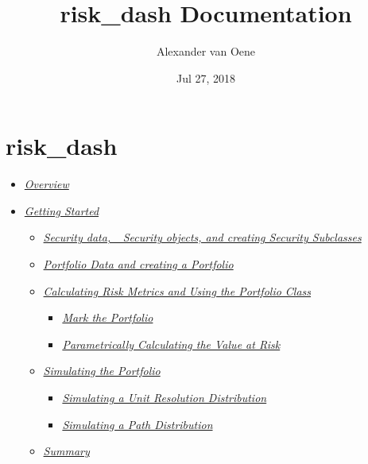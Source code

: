 \documentclass[letterpaper,10pt,english]{sphinxmanual}
\title{risk\_dash Documentation}
\date{Jul 27, 2018}
\author{Alexander van Oene}
\begin{document}
\maketitle
\sphinxtableofcontents
{}\label{\detokenize{index::doc}}

\label{\detokenize{gettingstarted:gettingstarted}}

\chapter{risk\_dash}
\label{\detokenize{gettingstarted:risk-dash}}\label{\detokenize{gettingstarted::doc}}\begin{itemize}
\item {} 
{\hyperref[\detokenize{gettingstarted:overview}]{\emph{Overview}}}

\item {} 
{\hyperref[\detokenize{gettingstarted:getting-started}]{\emph{Getting Started}}}
\begin{itemize}
\item {} 
{\hyperref[\detokenize{gettingstarted:security-data-security-objects-and-creating-security-subclasses}]{\emph{Security data, \_Security objects, and creating Security
Subclasses}}}

\item {} 
{\hyperref[\detokenize{gettingstarted:portfolio-data-and-creating-a-portfolio}]{\emph{Portfolio Data and creating a
Portfolio}}}

\item {} 
{\hyperref[\detokenize{gettingstarted:calculating-risk-metrics-and-using-the-portfolio-class}]{\emph{Calculating Risk Metrics and Using the Portfolio
Class}}}
\begin{itemize}
\item {} 
{\hyperref[\detokenize{gettingstarted:mark-the-portfolio}]{\emph{Mark the Portfolio}}}

\item {} 
{\hyperref[\detokenize{gettingstarted:parametrically-calculating-the-value-at-risk}]{\emph{Parametrically Calculating the Value at
Risk}}}

\end{itemize}

\item {} 
{\hyperref[\detokenize{gettingstarted:simulating-the-portfolio}]{\emph{Simulating the Portfolio}}}
\begin{itemize}
\item {} 
{\hyperref[\detokenize{gettingstarted:simulating-a-unit-resolution-distribution}]{\emph{Simulating a Unit Resolution
Distribution}}}

\item {} 
{\hyperref[\detokenize{gettingstarted:simulating-a-path-distribution}]{\emph{Simulating a Path
Distribution}}}

\end{itemize}

\item {} 
{\hyperref[\detokenize{gettingstarted:summary}]{\emph{Summary}}}

\end{itemize}

\end{itemize}
\end{document}
